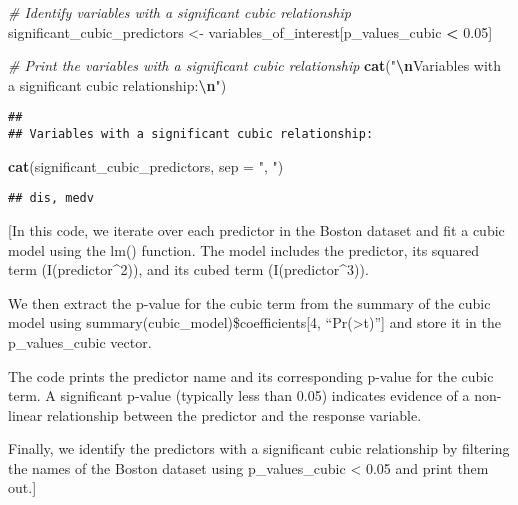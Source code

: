 \documentclass[
]{article}
\newenvironment{Shaded}{\begin{snugshade}}{\end{snugshade}}
\newcommand{\AttributeTok}[1]{\textcolor[rgb]{0.13,0.29,0.53}{#1}}
\newcommand{\CommentTok}[1]{\textcolor[rgb]{0.56,0.35,0.01}{\textit{#1}}}
\newcommand{\FloatTok}[1]{\textcolor[rgb]{0.00,0.00,0.81}{#1}}
\newcommand{\FunctionTok}[1]{\textcolor[rgb]{0.13,0.29,0.53}{\textbf{#1}}}
\newcommand{\NormalTok}[1]{#1}
\newcommand{\OtherTok}[1]{\textcolor[rgb]{0.56,0.35,0.01}{#1}}
\newcommand{\SpecialCharTok}[1]{\textcolor[rgb]{0.81,0.36,0.00}{\textbf{#1}}}
\newcommand{\StringTok}[1]{\textcolor[rgb]{0.31,0.60,0.02}{#1}}
\begin{document}
\begin{Shaded}
\begin{Highlighting}[]
\CommentTok{\# Identify variables with a significant cubic relationship}
\NormalTok{significant\_cubic\_predictors }\OtherTok{\textless{}{-}}\NormalTok{ variables\_of\_interest[p\_values\_cubic }\SpecialCharTok{\textless{}} \FloatTok{0.05}\NormalTok{]}

\CommentTok{\# Print the variables with a significant cubic relationship}
\FunctionTok{cat}\NormalTok{(}\StringTok{"}\SpecialCharTok{\textbackslash{}n}\StringTok{Variables with a significant cubic relationship:}\SpecialCharTok{\textbackslash{}n}\StringTok{"}\NormalTok{)}
\end{Highlighting}
\end{Shaded}

\begin{verbatim}
## 
## Variables with a significant cubic relationship:
\end{verbatim}

\begin{Shaded}
\begin{Highlighting}[]
\FunctionTok{cat}\NormalTok{(significant\_cubic\_predictors, }\AttributeTok{sep =} \StringTok{", "}\NormalTok{)}
\end{Highlighting}
\end{Shaded}

\begin{verbatim}
## dis, medv
\end{verbatim}

{[}In this code, we iterate over each predictor in the Boston dataset
and fit a cubic model using the lm() function. The model includes the
predictor, its squared term (I(predictor\^{}2)), and its cubed term
(I(predictor\^{}3)).

We then extract the p-value for the cubic term from the summary of the
cubic model using summary(cubic\_model)\$coefficients{[}4,
``Pr(\textgreater\textbar t\textbar)''{]} and store it in the
p\_values\_cubic vector.

The code prints the predictor name and its corresponding p-value for the
cubic term. A significant p-value (typically less than 0.05) indicates
evidence of a non-linear relationship between the predictor and the
response variable.

Finally, we identify the predictors with a significant cubic
relationship by filtering the names of the Boston dataset using
p\_values\_cubic \textless{} 0.05 and print them out.{]}
\end{document}
